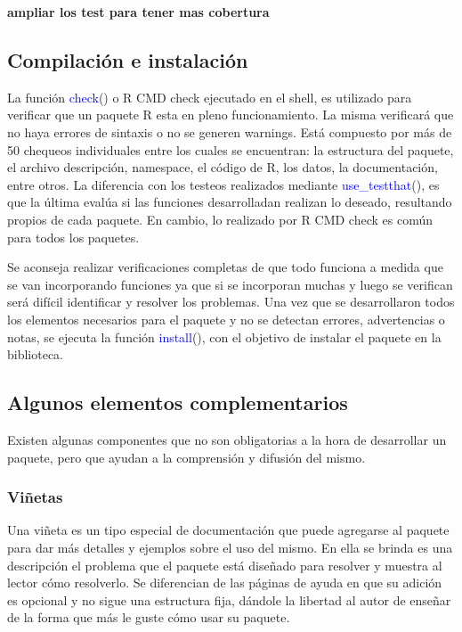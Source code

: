{\LARGE{\textbf{ampliar los test para tener mas cobertura}}}



\subsection{Compilación e instalación}

La función \textcolor{blue}{check}() o R CMD check ejecutado en el shell, es utilizado para verificar que un paquete R esta en pleno funcionamiento. La misma verificará que no haya errores de sintaxis o no se generen warnings. Está compuesto por más de 50 chequeos individuales entre los cuales se encuentran: la estructura del paquete, el archivo descripción, namespace, el código de R, los datos, la documentación, entre otros.  La diferencia con los testeos realizados mediante \textcolor{blue}{use\_testthat}(), es que la última evalúa si las funciones desarrolladan realizan lo deseado, resultando propios de cada paquete. En cambio, lo realizado por R CMD check es común para todos los paquetes. 

Se aconseja realizar verificaciones completas de que todo funciona a medida que se van incorporando funciones ya que si se incorporan muchas y luego se verifican será difícil identificar y resolver los problemas. Una vez que se desarrollaron todos los elementos necesarios para el paquete y no se detectan errores, advertencias o notas, se ejecuta la función \textcolor{blue}{install}(), con el objetivo de instalar el paquete en la biblioteca.


\subsection{Algunos elementos complementarios}

Existen algunas componentes que no son obligatorias a la hora de desarrollar un paquete, pero que ayudan a la comprensión y difusión del mismo.

\subsubsection{Viñetas}

Una viñeta es un tipo especial de documentación que puede agregarse al paquete para dar más detalles y ejemplos sobre el uso del mismo. En ella se brinda es una descripción el problema que el paquete está diseñado para resolver y muestra al lector cómo resolverlo. Se diferencian de las páginas de ayuda en que su adición es opcional y no sigue una estructura fija, dándole la libertad al autor de enseñar de la forma que más le guste cómo usar su paquete.

